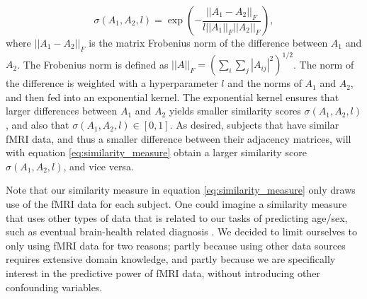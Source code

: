 \begin{equation}
    \sigma\left(A_1, A_2, l\right) = \exp{\left(- \frac{||A_1 - A_2||_F}{l ||A_1||_F ||A_2||_F} \right)},
    \label{eq:similarity_measure}
\end{equation}
where $||A_1 - A_2 ||_F$ is the matrix Frobenius norm of the difference between $A_1$ and $A_2$. The Frobenius norm is defined as $||A||_F = \left( \sum_i \sum_j |A_{ij}|^2 \right)^{1/2}$. The norm of the difference is weighted with a hyperparameter $l$ and the norms of $A_1$ and $A_2$, and then fed into an exponential kernel. The exponential kernel ensures that larger differences between $A_1$ and $A_2$ yields smaller similarity scores $\sigma\left(A_1, A_2, l\right)$, and also that  $\sigma\left(A_1, A_2, l\right) \in \left[0, 1\right]$. As desired, subjects that have similar fMRI data, and thus a smaller difference between their adjacency matrices, will with equation \eqref{eq:similarity_measure} obtain a larger similarity score $\sigma\left(A_1, A_2, l\right)$, and vice versa. 

Note that our similarity measure in equation \eqref{eq:similarity_measure} only draws use of the fMRI data for each subject. One could imagine a similarity measure that uses other types of data that is related to our tasks of predicting age/sex, such as eventual brain-health related diagnosis \cite{stankeviciute}. We decided to limit ourselves to only using fMRI data for two reasons; partly because using other data sources requires extensive domain knowledge, and partly because we are specifically interest in the predictive power of fMRI data, without introducing other confounding variables. 



